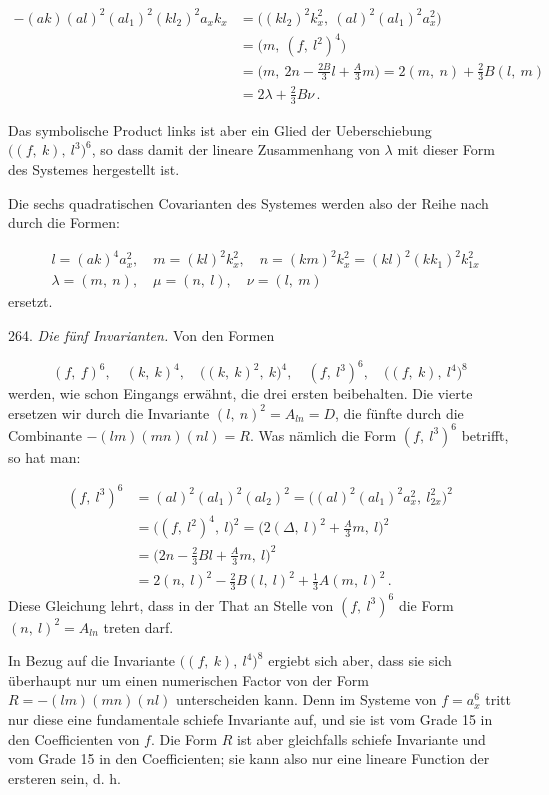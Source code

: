 \documentclass[11pt]{article}
\providecommand{\weberpage}[1]{}
\let\Delta\varDelta
\begin{document}
\[
\begin{aligned}
-(ak)(al)^2(al_1)^2(kl_2)^2a_xk_x &= \big((kl_2)^2k_x^2,\ (al)^2(al_1)^2a_x^2\big)\\
&= \big(m,\ (f,\ l^2)^4\big)\\
&= \Big(m,\ 2n-\frac{2B}{3}l+\frac{A}{3}m\Big) = 2(m,\ n)+\frac{2}{3}B(l,\ m)\\
&= 2\lambda+\frac{2}{3}B\nu\,.
\end{aligned}
\]

Das symbolische Product links ist aber ein Glied der Ueberschiebung
$\big((f,\ k),\ l^3\big)^6$, so dass damit der lineare Zusammenhang von $\lambda$
mit dieser Form des Systemes hergestellt ist.

Die sechs quadratischen Covarianten des Systemes werden also der Reihe nach
durch die Formen:

\[
\begin{aligned}
&l = (ak)^4a_x^2, \quad m = (kl)^2k_x^2, \quad n = (km)^2k_x^2 = (kl)^2(kk_1)^2k_{1x}^2\\
&\lambda = (m,\ n), \quad \mu = (n,\ l), \quad \nu = (l,\ m)
\end{aligned}
\]
ersetzt.


\weberpage{286}

264. \textit{Die fünf Invarianten.} Von den Formen

\[
(f,\ f)^6,\quad (k,\ k)^4,\quad \big((k,\ k)^2,\ k\big)^4,\quad (f,\ l^3)^6,\quad \big((f,\ k),\ l^4\big)^8
\]
werden, wie schon Eingangs erwähnt, die drei ersten beibehalten. Die vierte
ersetzen wir durch die Invariante $(l,\ n)^2 = A_{ln} = D$, die fünfte durch
die Combinante $-(lm)(mn)(nl) = R$. Was nämlich die Form $(f,\ l^3)^6$
betrifft, so hat man:

\[
\begin{aligned}
(f,\ l^3)^6 &= (al)^2(al_1)^2(al_2)^2 = \big((al)^2(al_1)^2a_x^2,\ l_{2x}^2\big)^2\\
&= \big((f,\ l^2)^4,\ l\big)^2 = \Big(2(\Delta,\ l)^2+\frac{A}{3}m,\ l\Big)^2\\
&= \Big(2n-\frac{2}{3}Bl+\frac{A}{3}m,\ l\Big)^2\\
&= 2(n,\ l)^2-\frac{2}{3}B(l,\ l)^2+\frac{1}{3}A(m,\ l)^2\,.
\end{aligned}
\]
Diese Gleichung lehrt, dass in der That an Stelle von $(f,\ l^3)^6$ die Form
$(n,\ l)^2 = A_{ln}$ treten darf.

In Bezug auf die Invariante $\big((f,\ k),\ l^4\big)^8$ ergiebt sich aber, dass
sie sich überhaupt nur um einen numerischen Factor von der Form
$R=-(lm)(mn)(nl)$ unterscheiden kann. Denn im Systeme von $f=a_x^6$ tritt nur
diese eine fundamentale schiefe Invariante auf, und sie ist vom Grade 15 in
den Coefficienten von $f$. Die Form $R$ ist aber gleichfalls schiefe Invariante
und vom Grade 15 in den Coefficienten; sie kann also nur eine lineare Function
der ersteren sein, d. h.
\end{document}
